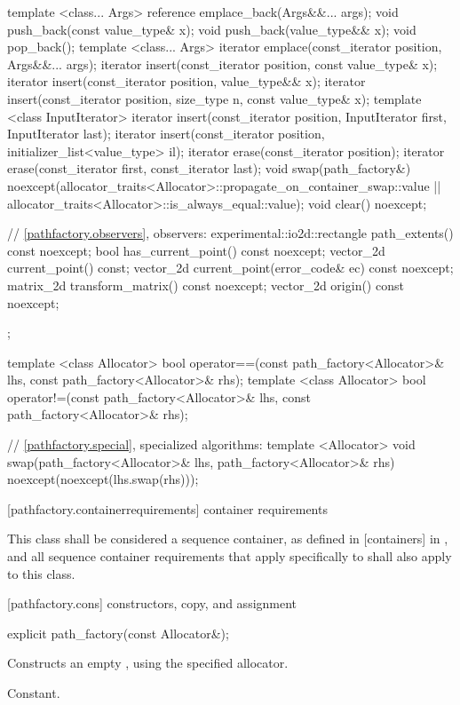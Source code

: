 \begin{codeblock}
{{{{{    template <class... Args>
    reference emplace_back(Args&&... args);
    void push_back(const value_type& x);
    void push_back(value_type&& x);
    void pop_back();
    template <class... Args>
    iterator emplace(const_iterator position, Args&&... args);
    iterator insert(const_iterator position, const value_type& x);
    iterator insert(const_iterator position, value_type&& x);
    iterator insert(const_iterator position, size_type n, const value_type& x);
    template <class InputIterator>
    iterator insert(const_iterator position, InputIterator first,
      InputIterator last);
    iterator insert(const_iterator position,
      initializer_list<value_type> il);
    iterator erase(const_iterator position);
    iterator erase(const_iterator first, const_iterator last);
    void swap(path_factory&)
      noexcept(allocator_traits<Allocator>::propagate_on_container_swap::value 
        || allocator_traits<Allocator>::is_always_equal::value);
    void clear() noexcept;

    // \ref{pathfactory.observers}, observers:
    experimental::io2d::rectangle path_extents() const noexcept;
    bool has_current_point() const noexcept;
    vector_2d current_point() const;
    vector_2d current_point(error_code& ec) const noexcept;
    matrix_2d transform_matrix() const noexcept;
    vector_2d origin() const noexcept;
  };

  
  template <class Allocator>
  bool operator==(const path_factory<Allocator>& lhs, 
    const path_factory<Allocator>& rhs);
  template <class Allocator>
  bool operator!=(const path_factory<Allocator>& lhs, 
    const path_factory<Allocator>& rhs);
  
  // \ref{pathfactory.special}, specialized algorithms:
  template <Allocator>
  void swap(path_factory<Allocator>& lhs, path_factory<Allocator>& rhs)
    noexcept(noexcept(lhs.swap(rhs)));
} } } }
\end{codeblock}

 [pathfactory.containerrequirements] { container requirements}

\pnum
This class shall be considered a sequence container, as defined in [containers] in \cppseventeen, and all sequence container requirements that apply specifically to  shall also apply to this class.

 [pathfactory.cons] { constructors, copy, and assignment}

\begin{itemdecl}
	explicit path_factory(const Allocator&);
\end{itemdecl}
\begin{itemdescr}
	\pnum
	\effects
	Constructs an empty , using the specified allocator.
	
	\pnum
	\complexity
	Constant.
\end{itemdescr}


